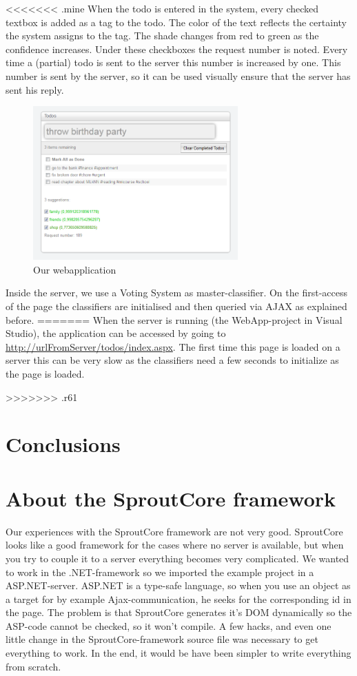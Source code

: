 \documentclass[a4paper,titlepage]{article}
\begin{document}
<<<<<<< .mine
When the todo is entered in the system, every checked textbox is added as a tag to the todo. The color of the text reflects the certainty the system assigns to the tag. The shade changes from red to green as the confidence increases. Under these checkboxes the request number is noted. Every time a (partial) todo is sent to the server this number is increased by one. This number is sent by the server, so it can be used visually ensure that the server has sent his reply.
\begin{figure} \centering \includegraphics[width=0.70\textwidth]{screenshot.PNG} \caption{Our webapplication} \end{figure}
Inside the server, we use a Voting System as master-classifier. On the first-access of the page the classifiers are initialised and then queried via AJAX as explained before. 
=======
When the server is running (the WebApp-project in Visual Studio), the application can be accessed by going to \url{http://urlFromServer/todos/index.aspx}. The first time this page is loaded on a server this can be very slow as the classifiers need a few seconds to initialize as the page is loaded.

>>>>>>> .r61
\section{Conclusions}
\section{About the SproutCore framework}
Our experiences with the SproutCore framework are not very good. SproutCore looks like a good framework for the cases where no server is available, but when you try to couple it to a server everything becomes very complicated. We wanted to work in the .NET-framework so we imported the example project in a ASP.NET-server. ASP.NET is a type-safe language, so when you use an object as a target for by example Ajax-communication, he seeks for the corresponding id in the page. 
The problem is that SproutCore generates it's DOM dynamically so the ASP-code cannot be checked, so it won't compile. A few hacks, and even one little change in the SproutCore-framework source file was necessary to get everything to work. In the end, it would be have been simpler to write everything from scratch. 
\end{document}
